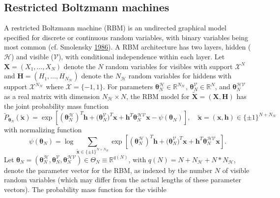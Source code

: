 \documentclass[]{article}
\theoremstyle{definition}
\begin{document}
\subsection{Restricted Boltzmann
machines}\label{restricted-boltzmann-machines}

A restricted Boltzmann machine (RBM) is an undirected graphical model
specified for discrete or continuous random variables, with binary
variables being most common (cf. Smolensky
\protect\hyperlink{ref-smolensky1986information}{1986}). A RBM
architecture has two layers, hidden (\(\mathcal{H}\)) and visible
(\(\mathcal{V}\)), with conditional independence within each layer. Let
\(\boldsymbol X = (X_1,\ldots,X_N)\) denote the \(N\) random variables
for visibles with support \(\mathcal{X}^N\) and
\(\boldsymbol H = (H_1,\ldots,H_{N_\mathcal{H}})\) denote the
\(N_\mathcal{H}\) random variables for hiddens with support
\(\mathcal{X}^{N_\mathcal{H}}\) where \(\mathcal{X} = \{-1,1\}\). For
parameters
\(\boldsymbol \theta_N^{\mathcal{H}} \in \mathbb{R}^{N_\mathcal{H}}\),
\(\boldsymbol \theta_N^{\mathcal{V}}\in \mathbb{R}^N\), and
\(\boldsymbol \theta_N^{\mathcal{HV}}\) as a real matrix with dimension
\(N_\mathcal{H} \times N\), the RBM model for
\(\tilde{\boldsymbol X}=(\boldsymbol X,\boldsymbol H)\) has the joint
probability mass function
\begin{equation}
\label{eq:RBM1}
\tilde{P}_{\boldsymbol \theta_N} (\tilde{\boldsymbol x}) = \exp\left[ (\boldsymbol \theta_N^{\mathcal{H}})^T \boldsymbol h + \boldsymbol (\boldsymbol \theta_N^{\mathcal{V}})^T \boldsymbol x + \boldsymbol h^T  \boldsymbol\theta_N^{\mathcal{HV}} \boldsymbol x - \psi(\boldsymbol \theta_N)\right], \quad \tilde{\boldsymbol x} = (\boldsymbol x, \boldsymbol h) \in \{\pm 1\}^{N+N_\mathcal{H}}
\end{equation}
with normalizing function \[
\psi(\boldsymbol \theta_N) = \log \sum_{\tilde{\boldsymbol x} \in \{\pm 1\}^{N+N_H} } \exp\left[ (\boldsymbol \theta_N^{\mathcal{H}})^T \boldsymbol h + \boldsymbol (\boldsymbol \theta_N^{\mathcal{V}})^T \boldsymbol x + \boldsymbol h^T  \boldsymbol\theta_N^{\mathcal{HV}} \boldsymbol x\right].
\] Let
\(\boldsymbol \theta_N = (\boldsymbol \theta_N^{\mathcal{H}}, \boldsymbol \theta_N^{\mathcal{V}}, \boldsymbol\theta_N^{\mathcal{HV}} ) \in \Theta_N \equiv \mathbb{R}^{q(N)}\),
with \(q(N) = N + N_\mathcal{H} + N*N_\mathcal{H}\), denote the
parameter vector for the RBM, as indexed by the number \(N\) of visible
random variables (which may differ from the actual lengths of these
parameter vectors). The probability mass function for the visible
\end{document}
